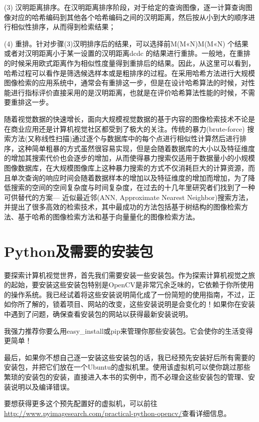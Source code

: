 \documentclass[color=cyan,mathpazo,titlestyle=hang]{elegantbook}
\begin{document}
(3) 汉明距离排序。在汉明距离排序阶段，对于给定的查询图像，逐一计算查询图像对应的哈希编码到其他各个哈希编码之间的汉明距离，然后按从小到大的顺序进行相似性排序，从而得到检索结果；

(4) 重排。针对步骤(3)汉明排序后的结果，可以选择前M(M«N)M(M«N) 个结果或者对汉明距离小于某一设置的汉明距离dcdc 的结果进行重排。一般地，在重排的时候采用欧式距离作为相似性度量得到重排后的结果。因此，从这里可以看到，哈希过程可以看作是筛选候选样本或是粗排序的过程。在采用哈希方法进行大规模图像检索的应用系统中，通常会有重排这一步，但是在设计哈希算法的时候，对性能进行指标评价直接采用的是汉明距离，也就是在评价哈希算法性能的时候，不需要重排这一步。

随着视觉数据的快速增长，面向大规模视觉数据的基于内容的图像检索技术不论是在商业应用还是计算机视觉社区都受到了极大的关注。传统的暴力(brute-force) 搜索方法(又称线性扫描)通过逐个与数据库中的每个点进行相似性计算然后进行排序，这种简单粗暴的方式虽然很容易实现，但是会随着数据库的大小以及特征维度的增加其搜索代价也会逐步的增加，从而使得暴力搜索仅适用于数据量小的小规模图像数据库，在大规模图像库上这种暴力搜索的方式不仅消耗巨大的计算资源，而且单次查询的响应时间会随着数据样本的增加以及特征维度的增加而增加，为了降低搜索的空间的空间复杂度与时间复杂度，在过去的十几年里研究者们找到了一种可供替代的方案— 近似最近邻(ANN, Approximate Nearest Neighbor)搜索方法，并提出了很多高效的检索技术，其中最成功的方法包括基于树结构的图像检索方法、基于哈希的图像检索方法和基于向量量化的图像检索方法。

\chapter{Python及需要的安装包}

要探索计算机视觉世界，首先我们需要安装一些安装包。作为探索计算机视觉之旅的起始，要安装这些安装包特别是OpenCV是非常冗余乏味的，它依赖于你所使用的操作系统。我已经试着将这些安装说明简化成了一份简短的使用指南，不过，正如你所了解的，锁着项目、网站的改变，这些安装说明是会变化的！如果你在安装中遇到了问题，确保查看安装包的网站以获得最新安装说明。

我强力推荐你要么用easy\_install或pip来管理你那些安装包。它会使你的生活变得更简单！

最后，如果你不想自己逐一安装这些安装包的话，我已经预先安装好后所有需要的安装包，并把它们放在一个Ubuntu的虚拟机里。使用该虚拟机可以使你跳过那些繁琐的安装包的安装，直接进入本书的实例中，而不必理会这些安装包的管理、安装说明以及编译错误。

要想获得更多这个预先配置好的虚拟机，可以前往\url{http://www.pyimagesearch.com/practical-python-opencv/}查看详细信息。
\end{document}
